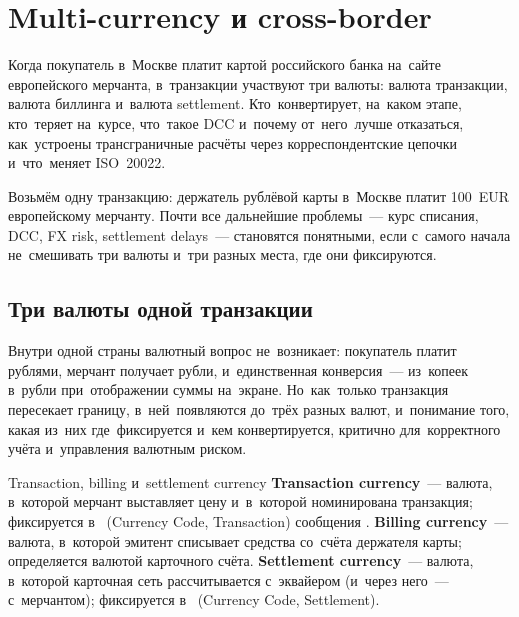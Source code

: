 \chapter{Multi-currency и cross-border}
\label{ch:multicurrency}

\begin{kaobox}[title=Что вы узнаете из этой главы]
  Когда покупатель в~Москве платит картой российского банка
  на~сайте европейского мерчанта, в~транзакции участвуют три
  валюты: валюта транзакции, валюта биллинга и~валюта settlement.
  Кто~конвертирует, на~каком этапе, кто~теряет на~курсе,
  что~такое DCC и~почему от~него~лучше отказаться,
  как~устроены трансграничные расчёты через корреспондентские
  цепочки и~что~меняет ISO~20022.
\end{kaobox}

Возьмём одну транзакцию: держатель рублёвой карты в~Москве платит
100~EUR европейскому мерчанту. Почти все дальнейшие проблемы~---
курс списания, DCC, FX risk, settlement delays~--- становятся
понятными, если с~самого начала не~смешивать три валюты и~три
разных места, где они фиксируются.

\section{Три валюты одной транзакции}
\label{sec:mc-currencies}

Внутри одной страны валютный вопрос не~возникает: покупатель
платит рублями, мерчант получает рубли, и~единственная конверсия~---
из~копеек в~рубли при~отображении суммы на~экране. Но~как~только
транзакция пересекает границу, в~ней~появляются до~трёх разных
валют, и~понимание того, какая из~них где~фиксируется и~кем
конвертируется, критично для~корректного учёта и~управления
валютным риском.

\begin{termdef}{Transaction, billing и~settlement currency}
  \textbf{Transaction currency}~--- валюта, в~которой мерчант
  выставляет цену и~в~которой номинирована транзакция;
  фиксируется в~ (Currency Code, Transaction)
  сообщения .
  \textbf{Billing currency}~--- валюта, в~которой эмитент
  списывает средства со~счёта держателя карты; определяется
  валютой карточного счёта.
  \textbf{Settlement currency}~--- валюта, в~которой карточная
  сеть рассчитывается с~эквайером (и~через него~--- с~мерчантом);
  фиксируется в~ (Currency Code, Settlement).
\end{termdef}

